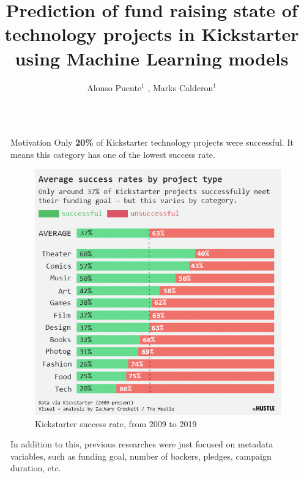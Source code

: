 \documentclass[final]{beamer}
\title{Prediction of fund raising state of technology projects in Kickstarter using Machine Learning models} %
\author{Alonso Puente$^{1}$ , Marks Calderon$^{1}$} %
\institute{$^{1}$ESAN University} %
\newlength{\sepwid}
\newlength{\onecolwid}
\begin{document}

\setlength{\belowcaptionskip}{2ex} %
\setlength\belowdisplayshortskip{2ex} %

\begin{frame}[t] %

\begin{columns}[t] %

\begin{column}{\sepwid}\end{column} %

\begin{column}{\onecolwid} %



\begin{block}{Motivation}
Only \textbf{20\%} of Kickstarter technology projects were successful. It means this category has one of the lowest success rate.
	\begin{figure}
		\includegraphics[width=0.5\linewidth]{kickstarter_success_rate_2009_2019.jpg}
		\caption{Kickstarter success rate, from 2009 to 2019}
	\end{figure}

In addition to this, previous researches were just focused on metadata variables, such as funding goal, number of backers, pledges, campaign duration, etc.


\end{block}
\end{column}
\end{columns}
\end{frame}
\end{document}
